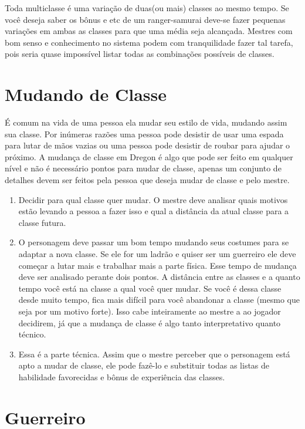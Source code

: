 Toda multiclasse é uma variação de duas(ou mais) classes ao mesmo tempo. Se você deseja saber os bônus e etc de um ranger-samurai deve-se fazer pequenas variações em ambas as classes para que uma média seja alcançada. Mestres com bom senso e conhecimento no sistema podem com tranquilidade fazer tal tarefa, pois seria quase impossível listar todas as combinações possíveis de classes.

\section{Mudando de Classe}

É comum na vida de uma pessoa ela mudar seu estilo de vida, mudando assim sua classe. Por inúmeras razões uma pessoa pode desistir de usar uma espada para lutar de mãos vazias ou uma pessoa pode desistir de roubar para ajudar o próximo. A mudança de classe em Dregon é algo que pode ser feito em qualquer nível e não é necessário pontos para mudar de classe, apenas um conjunto de detalhes devem ser feitos pela pessoa que deseja mudar de classe e pelo mestre.

\begin{enumerate}
	\item Decidir para qual classe quer mudar. O mestre deve analisar quais motivos estão levando a pessoa a fazer isso e qual a distância da atual classe para a classe futura.
	\item O personagem deve passar um bom tempo mudando seus costumes para se adaptar a nova classe. Se ele for um ladrão e quiser ser um guerreiro ele deve começar a lutar mais e trabalhar mais a parte física.
     Esse tempo de mudança deve ser analisado perante dois pontos. A distância entre as classes e a quanto tempo você está na classe a qual você quer mudar. Se você é dessa classe desde muito tempo, fica mais difícil para você abandonar a classe (mesmo que seja por um motivo forte). Isso cabe inteiramente ao mestre a ao jogador decidirem, já que a mudança de classe é algo tanto interpretativo quanto técnico.
	\item Essa é a parte técnica. Assim que o mestre perceber que o personagem está apto a mudar de classe, ele pode fazê-lo e substituir todas as listas de habilidade favorecidas e bônus de experiência das classes.
\end{enumerate}


\section{Guerreiro}

